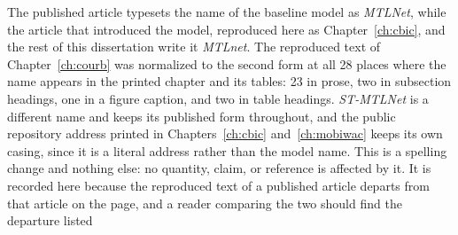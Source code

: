 The published article typesets the name of the baseline model as \emph{MTLNet}, while the
article that introduced the model, reproduced here as Chapter~\ref{ch:cbic}, and the rest
of this dissertation write it \emph{MTLnet}. The reproduced text of
Chapter~\ref{ch:courb} was normalized to the second form at all 28 places where the name
appears in the printed chapter and its tables: 23 in prose, two in subsection headings,
one in a figure caption, and two in table headings.
\emph{ST-MTLNet} is a different name and keeps its published form throughout, and the
public repository address printed in Chapters~\ref{ch:cbic} and~\ref{ch:mobiwac} keeps its
own casing, since it is a literal address rather than the model name. This is a
spelling change and nothing else: no quantity, claim, or reference is affected by it. It
is recorded here because the reproduced text of a published article departs from that
article on the page, and a reader comparing the two should find the departure listed

